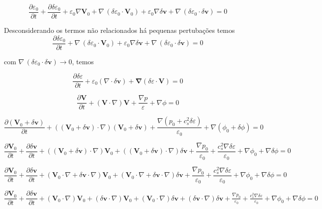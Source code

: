 \documentclass[a4paper,12pt]{article}
\begin{document}
$$\dfrac{\partial \varepsilon_0}{\partial t} +\dfrac{\partial \delta\varepsilon_0}{\partial t} +\varepsilon_0 \nabla\mathbf{V}_0+\nabla \,( \delta\varepsilon_0  \cdot \mathbf{V}_0) +\varepsilon_0\nabla \delta\mathbf{v}+\nabla \, ( \delta\varepsilon_0 \cdot \delta\mathbf{v})= 0$$

Desconsiderando os termos não relacionados há pequenas pertubações temos
$$\dfrac{\partial \delta\varepsilon_0}{\partial t} +\nabla \,( \delta\varepsilon_0  \cdot \mathbf{V}_0) +\varepsilon_0\nabla \delta\mathbf{v}+\nabla \, ( \delta\varepsilon_0 \cdot \delta\mathbf{v})= 0$$

com  $\nabla \, ( \delta\varepsilon_0 \cdot \delta\mathbf{v}) \to 0$, temos

\begin{equation}\label{eq36}
	\dfrac{\partial\delta\varepsilon}{\partial t} + \varepsilon_0(\nabla\cdot\delta\mathbf{v})+\mathbf{\nabla} (\delta\varepsilon \cdot \mathbf{V}) = 0
\end{equation}
\newline

$$\dfrac{\partial \textbf{V} }{\partial t} + (\textbf{V} \cdot \nabla ) \textbf{V} + \frac{\nabla p}{\varepsilon} + \nabla \phi =0$$

$$\dfrac{\partial (\mathbf{V}_0 + \delta\mathbf{v}) }{\partial t} + ((\mathbf{V}_0 + \delta\mathbf{v}) \cdot \nabla ) (\mathbf{V}_0 + \delta\mathbf{v}) + \frac{\nabla (p_0 + c_s^2\delta\varepsilon)}{\varepsilon_0} + \nabla (\phi_0 + \delta\phi) =0$$

$$\dfrac{\partial \mathbf{V}_0 }{\partial t} +\dfrac{\partial \delta\mathbf{v} }{\partial t}+ ((\mathbf{V}_0 + \delta\mathbf{v}) \cdot \nabla )\mathbf{V}_0+ ((\mathbf{V}_0 + \delta\mathbf{v}) \cdot \nabla )\delta\mathbf{v} + \frac{\nabla p_0}{\varepsilon_0}+ \frac{c_s^2\nabla\delta\varepsilon}{\varepsilon_0} + \nabla \phi_0+ \nabla\delta\phi =0$$

$$\dfrac{\partial \mathbf{V}_0 }{\partial t} +\dfrac{\partial \delta\mathbf{v} }{\partial t}+ (\mathbf{V}_0\cdot \nabla + \delta\mathbf{v}\cdot \nabla)\mathbf{V}_0+ (\mathbf{V}_0\cdot \nabla + \delta\mathbf{v}\cdot \nabla) \delta\mathbf{v} + \frac{\nabla p_0}{\varepsilon_0}+ \frac{c_s^2\nabla\delta\varepsilon}{\varepsilon_0} + \nabla \phi_0+ \nabla\delta\phi =0$$

$\displaystyle\dfrac{\partial \mathbf{V}_0 }{\partial t} +\dfrac{\partial \delta\mathbf{v} }{\partial t}+ (\mathbf{V}_0\cdot \nabla)\mathbf{V}_0+ (\delta\mathbf{v}\cdot \nabla)\mathbf{V}_0+ (\mathbf{V}_0\cdot \nabla) \delta\mathbf{v} + (\delta\mathbf{v}\cdot \nabla) \delta\mathbf{v} + \frac{\nabla p_0}{\varepsilon_0}+ \frac{c_s^2\nabla\delta\varepsilon}{\varepsilon_0} + \nabla \phi_0+ \nabla\delta\phi =0$
\end{document}

